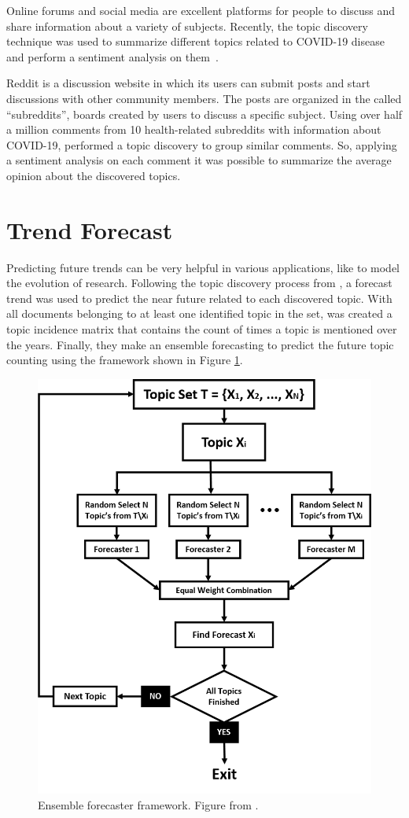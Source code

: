 Online forums and social media are excellent platforms for people to discuss and share information about a variety of subjects. Recently, the topic discovery technique was used to summarize different topics related to COVID-19 disease and perform a sentiment analysis on them~\cite{jelodar2020deep}.

Reddit is a discussion website in which its users can submit posts and start discussions with other community members. The posts are organized in the called ``subreddits'', boards created by users to discuss a specific subject. Using over half a million comments from 10 health-related subreddits with information about COVID-19,  performed a topic discovery to group similar comments. So, applying a sentiment analysis on each comment it was possible to summarize the average opinion about the discovered topics.

\section{Trend Forecast}

Predicting future trends can be very helpful in various applications, like to model the evolution of research. Following the topic discovery process from , a forecast trend was used to predict the near future related to each discovered topic. With all documents belonging to at least one identified topic in the set, was created a topic incidence matrix that contains the count of times a topic is mentioned over the years. Finally, they make an ensemble forecasting to predict the future topic counting using the framework shown in Figure \ref{fig:ensemble-forecasting-framework}.

\begin{figure}[h!]
	\centering
	\includegraphics[width=0.53\linewidth]{01.Chapters/03.RelatedWorks/ensemble-forecasting-framework}
	\caption{Ensemble forecaster framework. Figure from  .}
	\label{fig:ensemble-forecasting-framework}
\end{figure}


